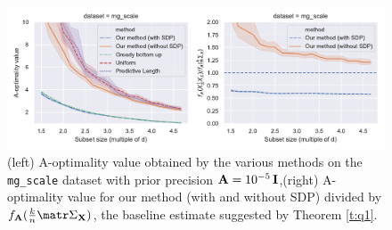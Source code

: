 \begin{figure}
    \centering
    \hspace{-0.35cm}
    \includegraphics[width=\textwidth]{Figures/mg_combined.pdf}
    \caption{(left) A-optimality value obtained by the various methods on
        the \texttt{mg\_scale} dataset \citep{libsvm} with
        prior precision $\mathbf A = 10^{-5}\, \mathbf I$,\quad (right)
        A-optimality value for our method (with and without SDP) divided by
        $f_{\A}(\frac kn\Sigmab_{\X})$, the baseline estimate suggested by Theorem \ref{t:q1}.}
    \label{f:experiments}
\end{figure}

